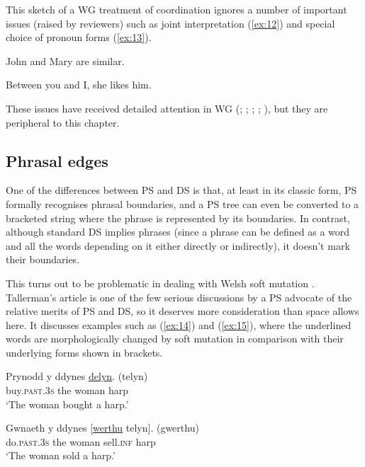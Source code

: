 \documentclass[output=paper]{langscibook}
\begin{document}
This sketch of a WG treatment of coordination ignores a number of important issues (raised by reviewers) such as joint interpretation (\ref{ex:12}) and special choice of pronoun forms (\ref{ex:13}).

\begin{exe}
	\ex \label{ex:12} John and Mary are similar.

	\ex \label{ex:13} Between you and I, she likes him.
\end{exe}

These issues have received detailed attention in WG (\citealt[Chapter~5]{Hudson84a-u}; \citeyear{Hudson88a}; \citeyear[Chapter~14]{Hudson90a-u}; \citeyear{Hudson1995}; \citeyear[175--181, 304--307]{Hudson2010b-u}), but they are peripheral to this chapter.


\subsection{Phrasal edges}
\label{sec:4.3}

One of the differences between PS and DS is that, at least in its classic form, PS formally recognises phrasal boundaries, and a PS tree can even be converted to a bracketed string where the phrase is represented by its boundaries. In contrast, although standard DS implies phrases (since a phrase can be defined as a word and all the words depending on it either directly or indirectly), it doesn’t mark their boundaries.

This turns out to be problematic in dealing with Welsh soft mutation \citep{Tallerman2009}. Tallerman’s article is one of the few serious discussions by a PS advocate of the relative merits of PS and DS, so it deserves more consideration than space allows here. It discusses examples such as (\ref{ex:14}) and (\ref{ex:15}), where the underlined words are morphologically changed by soft mutation in comparison with their underlying forms shown in brackets.

\begin{exe}
	\ex \label{ex:14}
	\gll Prynodd y ddynes \underline{delyn}. (telyn)\\
	buy.\textsc{past}.3\textsc{s} the woman harp\\
	\glt ‘The woman bought a harp.’

	\ex \label{ex:15}
	\gll Gwnaeth y ddynes [\underline{werthu} telyn]. (gwerthu)\\
	do.\textsc{past}.3\textsc{s} the woman sell.\textsc{inf} harp\\
	\glt ‘The woman sold a harp.’
\end{exe}
\end{document}
